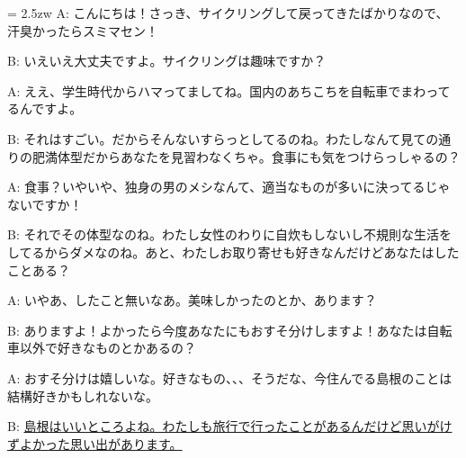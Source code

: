 \documentclass[11pt]{amsart}
\title{}
\author{}
\newenvironment{hangall}[1]{\hangindent = 2.5zw\everypar{\hangindent = 2.5zw}}{}
\begin{document}
\maketitle
\begin{hangall}{}%
A: こんにちは！さっき、サイクリングして戻ってきたばかりなので、汗臭かったらスミマセン！

B: いえいえ大丈夫ですよ。サイクリングは趣味ですか？

A: ええ、学生時代からハマってましてね。国内のあちこちを自転車でまわってるんですよ。

B: それはすごい。だからそんないすらっとしてるのね。わたしなんて見ての通りの肥満体型だからあなたを見習わなくちゃ。食事にも気をつけらっしゃるの？

A: 食事？いやいや、独身の男のメシなんて、適当なものが多いに決ってるじゃないですか！

B: それでその体型なのね。わたし女性のわりに自炊もしないし不規則な生活をしてるからダメなのね。あと、わたしお取り寄せも好きなんだけどあなたはしたことある？

A: いやあ、したこと無いなあ。美味しかったのとか、あります？

B: ありますよ！よかったら今度あなたにもおすそ分けしますよ！あなたは自転車以外で好きなものとかあるの？

A: おすそ分けは嬉しいな。好きなもの、、、そうだな、今住んでる島根のことは結構好きかもしれないな。

B: \ul{島根はいいところよね。わたしも旅行で行ったことがあるんだけど思いがけずよかった思い出があります。}\end{hangall}
\end{document}
